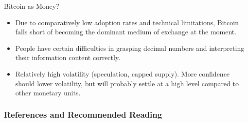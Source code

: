 \documentclass[]{beamer}
\begin{document}
\begin{frame}{Bitcoin as Money?}
	\begin{figure}
	\end{figure}
	\begin{itemize}
			\item<1-> Due to comparatively low adoption rates and technical limitations, Bitcoin falls short of becoming the dominant medium of exchange at the moment.
			\item<2-> People have certain difficulties in grasping decimal numbers and interpreting their information content correctly.
			\item<3-> Relatively high volatility (speculation, capped supply). More confidence should lower volatility, but will probably settle at a high level compared to other monetary units.
	\end{itemize}
\end{frame}


\begin{frame}%
\frametitle{References and Recommended Reading}
	
	
\end{frame}
\end{document}
